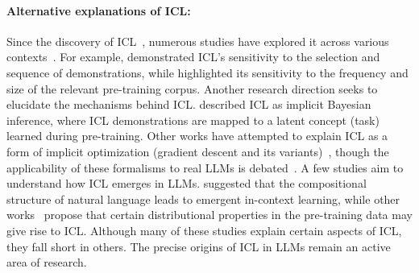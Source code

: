 \documentclass[11pt]{article}
\begin{document}
\paragraph{Alternative explanations of ICL:} Since the discovery of ICL~\citep{brown2020language}, numerous studies have explored it across various contexts~\citep{zhao2021calibrate,min2022rethinking,mishra2022reframing,han2023understanding,wang2023selfinstruct,sia2024does,vacareanu2024words,mueller2024context}. For example, \citet{perez2021true,Lu2022FantasticallyOP,mishra2022reframing} demonstrated ICL's sensitivity to the selection and sequence of demonstrations, while \citet{shin2022effect,razeghi2022impact} highlighted its sensitivity to the frequency and size of the relevant pre-training corpus. Another research direction seeks to elucidate the mechanisms behind ICL. \citet{xie2021explanation} described ICL as implicit Bayesian inference, where ICL demonstrations are mapped to a latent concept (task) learned during pre-training. Other works have attempted to explain ICL as a form of implicit optimization (gradient descent and its variants)~\citep{garg2022can,zhang2023trained,dai2022can,akyurek2022learning,von2023transformers,li2023closeness}, though the applicability of these formalisms to real LLMs is debated~\citep{shen2024icl_vs_gd}. A few studies aim to understand how ICL emerges in LLMs. \citet{hahn2023theory} suggested that the compositional structure of natural language leads to emergent in-context learning, while other works~\citep{chan2022data} propose that certain distributional properties in the pre-training data may give rise to ICL. Although many of these studies explain certain aspects of ICL, they fall short in others. The precise origins of ICL in LLMs remain an active area of research.
\end{document}
